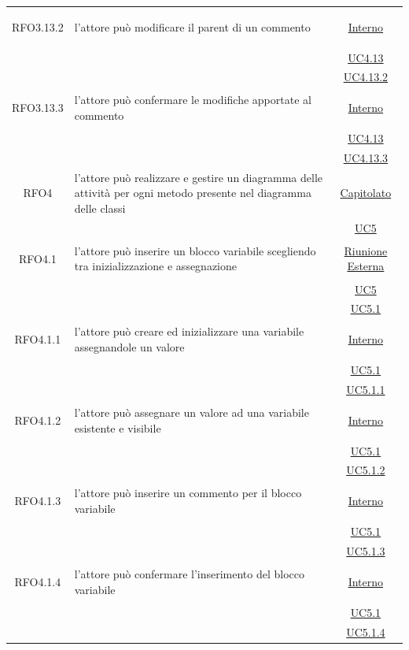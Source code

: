 \begin{longtable}{|c|>{\centering}m{7cm}|c|}
\hypertarget{RFO3.13.2}{RFO3.13.2} & l'attore può modificare il parent di un commento &  \hyperlink{Interno}{Interno}\\
& &\hyperref[UC4.13]{UC4.13}\\
& &\hyperref[UC4.13.2]{UC4.13.2}\\ \hline

\hypertarget{RFO3.13.3}{RFO3.13.3} & l'attore può confermare le modifiche apportate al commento &  \hyperlink{Interno}{Interno}\\
& &\hyperref[UC4.13]{UC4.13}\\
& &\hyperref[UC4.13.3]{UC4.13.3}\\ \hline

\hypertarget{RFO4}{RFO4} & l'attore può realizzare e gestire un diagramma delle attività per ogni metodo presente nel diagramma delle classi & \hyperlink{Capitolato}{Capitolato}\\
& & \hyperref[UC5]{UC5}\\ \hline

\hypertarget{RFO4.1}{RFO4.1} & l'attore può inserire un blocco variabile scegliendo tra inizializzazione e assegnazione &  \hyperlink{Riunione Esterna}{Riunione Esterna}\\
& &\hyperref[UC5]{UC5}\\
& &\hyperref[UC5.1]{UC5.1}\\ \hline

\hypertarget{RFO4.1.1}{RFO4.1.1} & l'attore può creare ed inizializzare una variabile assegnandole un valore & \hyperlink{Interno}{Interno}\\
& &\hyperref[UC5.1]{UC5.1}\\
& &\hyperref[UC5.1.1]{UC5.1.1}\\ \hline

\hypertarget{RFO4.1.2}{RFO4.1.2} & l'attore può assegnare un valore ad una variabile esistente e visibile & \hyperlink{Interno}{Interno}\\
& &\hyperref[UC5.1]{UC5.1}\\
& &\hyperref[UC5.1.2]{UC5.1.2}\\ \hline

\hypertarget{RFO4.1.3}{RFO4.1.3} & l'attore può inserire un commento per il blocco variabile & \hyperlink{Interno}{Interno}\\
& &\hyperref[UC5.1]{UC5.1}\\
& &\hyperref[UC5.1.3]{UC5.1.3}\\ \hline

\hypertarget{RFO4.1.4}{RFO4.1.4} & l'attore può confermare l'inserimento del blocco variabile &\hyperlink{Interno}{Interno}\\
& &\hyperref[UC5.1]{UC5.1}\\
& &\hyperref[UC5.1.4]{UC5.1.4}\\ \hline


\end{longtable}
